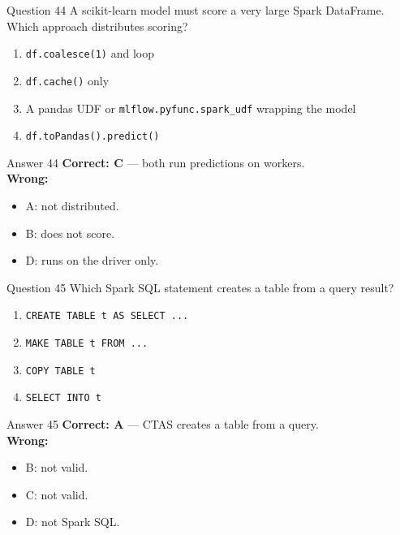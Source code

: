 \documentclass[aspectratio=169,11pt]{beamer}
\begin{document}
\begin{frame}{Question 44}
A scikit-learn model must score a very large Spark DataFrame. Which approach distributes scoring?
\begin{enumerate}[label=\Alph*.]
\item \texttt{df.coalesce(1)} and loop
\item \texttt{df.cache()} only
\item A pandas UDF or \texttt{mlflow.pyfunc.spark\_udf} wrapping the model
\item \texttt{df.toPandas().predict()}
\end{enumerate}
\end{frame}
\begin{frame}{Answer 44}
\textbf{Correct: C} --- both run predictions on workers.\\
\vspace{0.5em}
\textbf{Wrong:}
\begin{itemize}
\item A: not distributed.
\item B: does not score.
\item D: runs on the driver only.
\end{itemize}
\end{frame}

\begin{frame}{Question 45}
Which Spark SQL statement creates a table from a query result?
\begin{enumerate}[label=\Alph*.]
\item \texttt{CREATE TABLE t AS SELECT ...}
\item \texttt{MAKE TABLE t FROM ...}
\item \texttt{COPY TABLE t}
\item \texttt{SELECT INTO t}
\end{enumerate}
\end{frame}
\begin{frame}{Answer 45}
\textbf{Correct: A} --- CTAS creates a table from a query.\\
\vspace{0.5em}
\textbf{Wrong:}
\begin{itemize}
\item B: not valid.
\item C: not valid.
\item D: not Spark SQL.
\end{itemize}
\end{frame}
\end{document}
